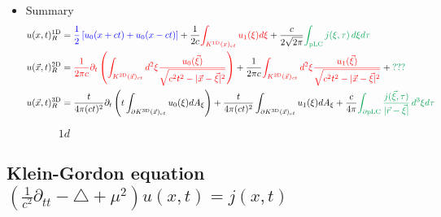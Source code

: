 \documentclass[../main.tex]{subfiles}
\begin{document}
\begin{itemize}
\item Summary
\begin{align}
u(x,t)^\text{1D}_R&=
\textcolor{blue}{\frac{1}{2}\left[u_0(x+ct)+u_0(x-ct)\right]}+\frac{1}{2c}
\textcolor{red}{\int_{K^\text{1D}(x)_{ct}}u_1(\xi)d\xi}+\frac{c}{2\sqrt{2\pi}}
\textcolor{Green}{\int_\text{pLC} j(\xi,\tau)\,d\xi d\tau}\\
%
u(\vec{x},t)^\text{2D}_R&=\textcolor{red}{\frac{1}{2\pi c}\partial_t\left(\int_{K^\text{2D}(\vec{x})_{ct}} d^2\xi \frac{u_0(\vec{\xi})}{\sqrt{c^2t^2-|\vec{x}-\vec{\xi}|^2}}\right)}+\frac{1}{2\pi c}\textcolor{red}{\int_{K^\text{2D}(\vec{x})_{ct}} d^2\xi \frac{u_1(\vec{\xi})}{\sqrt{c^2t^2-|\vec{x}-\vec{\xi}|^2}}}+
\textcolor{Green}{???}\\
%
u(\vec{x},t)^\text{3D}_R&=\frac{t}{4\pi(ct)^2}\partial_t\left(t\int_{\partial K^\text{3D}(\vec{x})_{ct}}u_0(\xi)dA_\xi\right)+\frac{t}{4\pi(ct)^2}\int_{\partial K^\text{3D}(\vec{x})_{ct}}u_1(\xi)dA_\xi+\frac{c}{4\pi}
\textcolor{Green}{\int_{\partial\text{pLC}} \frac{j(\vec{\xi},\tau)}{|\vec{r}-\vec{\xi}|}\,d^3\xi d\tau}
\end{align}
\begin{figure}[!h]
$1d$\newline
\begin{center}
\end{center}
\end{figure}

\end{itemize}

\newpage
\subsection{Klein-Gordon equation \texorpdfstring{$\left(\frac{1}{c^2}\partial_{tt}-\triangle+\mu^2\right) u(x,t)= j(x,t)$}{TEXT}}
\end{document}
